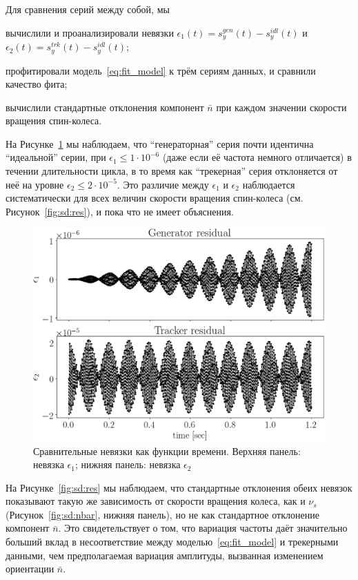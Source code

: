 Для сравнения серий между собой, мы
\begin{enumerate*}
\item вычислили и проанализировали невязки ${\epsilon_1(t) = s_y^{gen}(t) -
  s_y^{idl}(t)}$ и ${\epsilon_2(t) = s_y^{trk}(t) - s_y^{idl}(t)}$;
\item профитировали модель~\eqref{eq:fit_model} к трём сериям данных, и
  сравнили качество фита;
\item вычислили стандартные отклонения компонент $\bar n$ при каждом
  значении скорости вращения спин-колеса.
\end{enumerate*}

На Рисунке~\ref{fig:residuals} мы наблюдаем, что ``генераторная'' серия почти идентична
``идеальной'' серии, при ${\epsilon_1 \le 1\cdot10^{-6}}$ 
(даже если её частота немного отличается) в течении длительности цикла,
в то время как ``трекерная'' серия отклоняется от неё на уровне
${\epsilon_2 \le 2\cdot 10^{-5}}$.  Это различие между $\epsilon_1$ и $\epsilon_2$ наблюдается
систематически для всех величин скорости вращения спин-колеса (см. Рисунок~\ref{fig:sd:res}), 
и пока что не имеет объяснения.

\begin{figure}[h]
	\centering
	\includegraphics[height=.33\paperheight]{images/smp_sim/residual_vs_time(both)}
	\caption{Сравнительные невязки как функции времени.
		Верхняя панель: невязка $\epsilon_1$; нижняя панель: невязка $\epsilon_2$\label{fig:residuals}}
\end{figure}

На Рисунке~\ref{fig:sd:res} мы наблюдаем, что стандартные отклонения обеих невязок показывают 
такую же зависимость от скорости вращения колеса, как и $\nu_s$ (Рисунок~\ref{fig:sd:nbar}, нижняя панель),
 но не как стандартное отклонение компонент $\bar n$.
Это свидетельствует о том, что вариация частоты даёт значительно больший вклад в несоответствие между
моделью~\eqref{eq:fit_model} и трекерными данными, чем предполагаемая вариация амплитуды, вызванная изменением ориентации $\bar n$.

